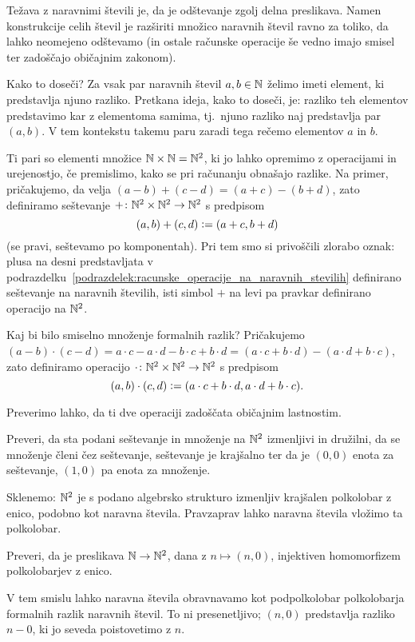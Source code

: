 Težava z naravnimi števili je, da je odštevanje zgolj delna preslikava. Namen konstrukcije celih števil je razširiti množico naravnih števil ravno za toliko, da lahko neomejeno odštevamo (in ostale računske operacije še vedno imajo smisel ter zadoščajo običajnim zakonom).

Kako to doseči? Za vsak par naravnih števil $a, b \in \mathbb{N}$ želimo imeti element, ki predstavlja njuno razliko. Pretkana ideja, kako to doseči, je: razliko teh elementov predstavimo kar z elementoma samima, tj.~njuno razliko naj predstavlja par $(a, b)$. V tem kontekstu takemu paru zaradi tega rečemo  elementov $a$ in $b$.

Ti pari so elementi množice $\mathbb{N} \times \mathbb{N} = \mathbb{N}^2$, ki jo lahko opremimo z operacijami in urejenostjo, če premislimo, kako se pri računanju obnašajo razlike. Na primer, pričakujemo, da velja $(a - b) + (c - d) = (a + c) - (b + d)$, zato definiramo seštevanje $+\colon \mathbb{N}^2 \times \mathbb{N}^2 \to \mathbb{N}^2$ s predpisom
\[(a, b) + (c, d) \mathrel{\mathop:}= (a + c, b + d)\]
(se pravi, seštevamo po komponentah). Pri tem smo si privoščili zlorabo oznak: plusa na desni predstavljata v podrazdelku~\ref{podrazdelek:racunske_operacije_na_naravnih_stevilih} definirano seštevanje na naravnih številih, isti simbol $+$ na levi pa pravkar definirano operacijo na $\mathbb{N}^2$.

Kaj bi bilo smiselno množenje formalnih razlik? Pričakujemo $(a - b) \cdot (c - d) = a \cdot c - a \cdot d - b \cdot c + b \cdot d = (a \cdot c + b \cdot d) - (a \cdot d + b \cdot c)$, zato definiramo operacijo $\cdot\colon \mathbb{N}^2 \times \mathbb{N}^2 \to \mathbb{N}^2$ s predpisom
\[(a, b) \cdot (c, d) \mathrel{\mathop:}= (a \cdot c + b \cdot d, a \cdot d + b \cdot c).\]

Preverimo lahko, da ti dve operaciji zadoščata običajnim lastnostim.
%
\begin{naloga}
Preveri, da sta podani seštevanje in množenje na $\mathbb{N}^2$ izmenljivi in družilni, da se množenje členi čez seštevanje, seštevanje je krajšalno ter da je $(0, 0)$ enota za seštevanje, $(1, 0)$ pa enota za množenje.
\end{naloga}
%
Sklenemo: $\mathbb{N}^2$ je s podano algebrsko strukturo izmenljiv krajšalen polkolobar z enico, podobno kot naravna števila. Pravzaprav lahko naravna števila vložimo ta polkolobar.
%
\begin{naloga}
Preveri, da je preslikava $\mathbb{N} \to \mathbb{N}^2$, dana z $n \mapsto (n, 0)$, injektiven homomorfizem polkolobarjev z enico.
\end{naloga}
%
V tem smislu lahko naravna števila obravnavamo kot podpolkolobar polkolobarja formalnih razlik naravnih števil. To ni presenetljivo; $(n, 0)$ predstavlja razliko $n - 0$, ki jo seveda poistovetimo z $n$.

